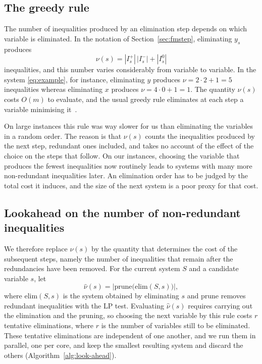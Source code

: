 \documentclass[11pt]{article}
\theoremstyle{definition}
\newcommand{\Ipos}{I^{+}}
\newcommand{\Ineg}{I^{-}}
\newcommand{\Izero}{I^{0}}
\newcommand{\LPprune}{\mathrm{prune}}
\newcommand{\FMstep}{\mathrm{elim}}
\begin{document}
\subsection{The greedy rule}
\label{sec:greedy}

The number of inequalities produced by an elimination step depends on which variable is eliminated. In the notation of Section~\ref{sec:fmstep}, eliminating $y_s$ produces
\begin{equation}
\nu(s)=|\Ipos_s|\,|\Ineg_s|+|\Izero_s|
\label{eq:nu}
\end{equation}
inequalities, and this number varies considerably from variable to variable. In the system \eqref{eq:example}, for instance, eliminating $y$ produces $\nu=2\cdot 2+1=5$ inequalities whereas eliminating $x$ produces $\nu=4\cdot 0+1=1$. The quantity $\nu(s)$ costs $O(m)$ to evaluate, and the usual greedy rule eliminates at each step a variable minimising it~\cite{huynh1992}.

On large instances this rule was way slower for us than eliminating the variables in a random order. The reason is that $\nu(s)$ counts the inequalities produced by the next step, redundant ones included, and takes no account of the effect of the choice on the steps that follow. On our instances, choosing the variable that produces the fewest inequalities now routinely leads to systems with many more non-redundant inequalities later. An elimination order has to be judged by the total cost it induces, and the size of the next system is a poor proxy for that cost.

\subsection{Lookahead on the number of non-redundant inequalities}
\label{sec:look-ahead}

We therefore replace $\nu(s)$ by the quantity that determines the cost of the subsequent steps, namely the number of inequalities that remain after the redundancies have been removed. For the current system $S$ and a candidate variable $s$, let
\begin{equation}
\hat\nu(s)=\big|\LPprune\big(\FMstep(S,s)\big)\big|,
\label{eq:nuhat}
\end{equation}
where $\FMstep(S,s)$ is the system obtained by eliminating $s$ and $\LPprune$ removes redundant inequalities with the LP test. Evaluating $\hat\nu(s)$ requires carrying out the elimination and the pruning, so choosing the next variable by this rule costs $r$ tentative eliminations, where $r$ is the number of variables still to be eliminated. These tentative eliminations are independent of one another, and we run them in parallel, one per core, and keep the smallest resulting system and discard the others (Algorithm~\ref{alg:look-ahead}). %
\end{document}
